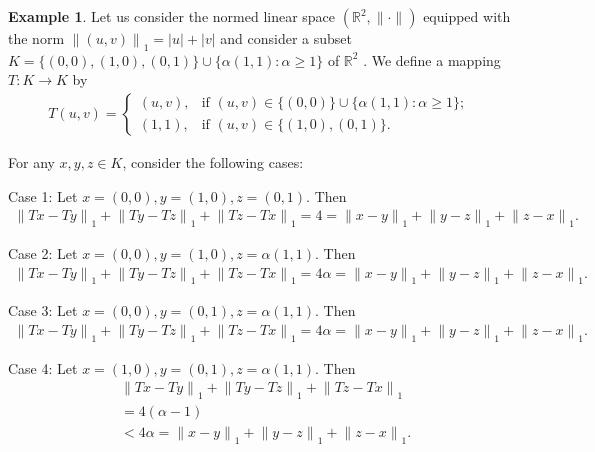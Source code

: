 \documentclass[11pt,reqno]{amsart}
\theoremstyle{definition}
\newtheorem{example}[theorem]{Example}
\newtheorem{Open Prob}[theorem]{Open Problem}
\theoremstyle{remark}
\numberwithin{equation}{section}
\begin{document}
\begin{example}\label{E22}
Let us consider the normed linear space $(\mathbb{R}^2,\|\cdot\|)$  equipped with the norm ${\lVert (u,v) \rVert}_1 = |u| + |v|$ and consider  a subset $K=\{(0,0), (1,0), (0,1)\} \cup \{\alpha (1,1): \alpha \geq 1\}$ of $\mathbb{R}^2$ . We define a mapping $T:K \to K$ by 
\begin{align*}
T(u,v)= 
\begin{cases}
(u,v), &\text{if $(u,v)\in \{(0,0)\} \cup \{\alpha (1,1): \alpha \geq 1\}$};\\ 
(1,1), &\text{if $(u,v)\in \{(1,0), (0,1)\}$}.
\end{cases}
\end{align*}

\medskip

For any $x, y, z \in K$, consider the following cases:

\medskip

Case 1: Let $x=(0,0), y=(1,0), z=(0,1)$.
Then
\begin{align*}
  {\lVert Tx-Ty \rVert}_1 + {\lVert Ty-Tz \rVert}_1 + {\lVert Tz-Tx \rVert}_1 = 4 ={\lVert x-y \rVert}_1 + {\lVert y-z \rVert}_1 + {\lVert z-x \rVert}_1.  
\end{align*}

\medskip

Case 2: Let $x=(0,0), y=(1,0), z=\alpha(1,1)$.
Then
\begin{align*}
  {\lVert Tx-Ty \rVert}_1 + {\lVert Ty-Tz \rVert}_1 + {\lVert Tz-Tx \rVert}_1 
  = 4 \alpha ={\lVert x-y \rVert}_1 + {\lVert y-z \rVert}_1 + {\lVert z-x \rVert}_1. 
\end{align*}

\medskip

Case 3: Let $x=(0,0), y=(0,1), z=\alpha(1,1)$.
Then
\begin{align*}
  {\lVert Tx-Ty \rVert}_1 + {\lVert Ty-Tz \rVert}_1 + {\lVert Tz-Tx \rVert}_1 
  = 4 \alpha ={\lVert x-y \rVert}_1 + {\lVert y-z \rVert}_1 + {\lVert z-x \rVert}_1.  
\end{align*}

\medskip

Case 4: Let $x=(1,0), y=(0,1), z=\alpha(1,1)$.
Then
\begin{align*}
  &{\lVert Tx-Ty \rVert}_1 + {\lVert Ty-Tz \rVert}_1 + {\lVert Tz-Tx \rVert}_1 \\
 & = 4(\alpha -1)\\
  &< 4 \alpha={\lVert x-y \rVert}_1 + {\lVert y-z \rVert}_1 + {\lVert z-x \rVert}_1.
\end{align*}


\end{example}
\end{document}
